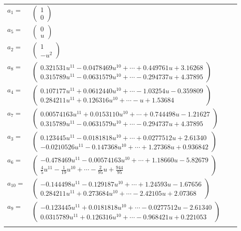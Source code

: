 \documentclass[1p]{elsarticle_modified}
\theoremstyle{definition}
\begin{document}
\begin{tabular}{m{7pt} m{180pt} m{7pt} m{180pt} }
\flushright $a_{1}=$&$\begin{pmatrix}1\\0\end{pmatrix}$ \\
\flushright $a_{5}=$&$\begin{pmatrix}0\\u\end{pmatrix}$ \\
\flushright $a_{2}=$&$\begin{pmatrix}1\\- u^2\end{pmatrix}$ \\
\flushright $a_{8}=$&$\begin{pmatrix}0.321531 u^{11}-0.0478469 u^{10}+\cdots+0.449761 u+3.16268\\0.315789 u^{11}-0.0631579 u^{10}+\cdots-0.294737 u+4.37895\end{pmatrix}$ \\
\flushright $a_{4}=$&$\begin{pmatrix}0.107177 u^{11}+0.0612440 u^{10}+\cdots-1.03254 u-0.359809\\0.284211 u^{11}+0.126316 u^{10}+\cdots-u+1.53684\end{pmatrix}$ \\
\flushright $a_{7}=$&$\begin{pmatrix}0.00574163 u^{11}+0.0153110 u^{10}+\cdots+0.744498 u-1.21627\\0.315789 u^{11}-0.0631579 u^{10}+\cdots-0.294737 u+4.37895\end{pmatrix}$ \\
\flushright $a_{3}=$&$\begin{pmatrix}0.123445 u^{11}-0.0181818 u^{10}+\cdots+0.0277512 u+2.61340\\-0.0210526 u^{11}-0.147368 u^{10}+\cdots+1.27368 u+0.936842\end{pmatrix}$ \\
\flushright $a_{6}=$&$\begin{pmatrix}-0.478469 u^{11}-0.00574163 u^{10}+\cdots+1.18660 u-5.82679\\\frac{4}{5} u^{11}-\frac{1}{19} u^{10}+\cdots-\frac{2}{95} u+\frac{944}{95}\end{pmatrix}$ \\
\flushright $a_{10}=$&$\begin{pmatrix}-0.144498 u^{11}-0.129187 u^{10}+\cdots+1.24593 u-1.67656\\0.284211 u^{11}+0.273684 u^{10}+\cdots-2.42105 u+2.07368\end{pmatrix}$ \\
\flushright $a_{9}=$&$\begin{pmatrix}-0.123445 u^{11}+0.0181818 u^{10}+\cdots-0.0277512 u-2.61340\\0.0315789 u^{11}+0.126316 u^{10}+\cdots-0.968421 u+0.221053\end{pmatrix}$\\&\end{tabular}
\end{document}
